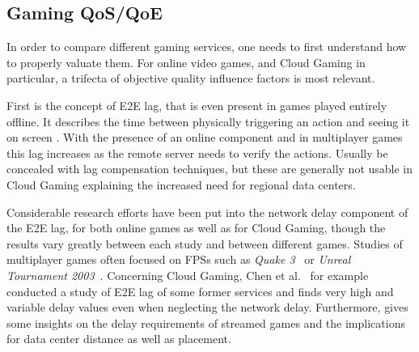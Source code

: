 

\subsection{Gaming QoS/QoE}

In order to compare different gaming services, one needs to first understand how to properly valuate them. For online video games, and Cloud Gaming in particular, a trifecta of objective quality influence factors is most relevant.

First is the concept of \gls{E2E} lag, that is even present in games played entirely offline. It describes the time between physically triggering an action and seeing it on screen \cite{metzger16lagmodel}. With the presence of an online component and in multiplayer games this lag increases as the remote server needs to verify the actions. Usually be concealed with lag compensation techniques, but these are generally not usable in Cloud Gaming explaining the increased need for regional data centers.

Considerable research efforts have been put into the network delay component of the \gls{E2E} lag, for both online games as well as for Cloud Gaming, though the results vary greatly between each study and between different games. Studies of multiplayer games often focused on \glspl{FPS} such as \textit{Quake 3}~\cite{1266180} or \textit{Unreal Tournament 2003}~\cite{Beigbeder:2004:ELL:1016540.1016556}. Concerning Cloud Gaming, Chen et al.~\cite{6670099} for example conducted a study of \gls{E2E} lag of some former services and finds very high and variable delay values even when neglecting the network delay.
Furthermore, \cite{Choy:2012:BSC:2501560.2501563} gives some insights on the delay requirements of streamed games and the implications for data center distance as well as placement.

